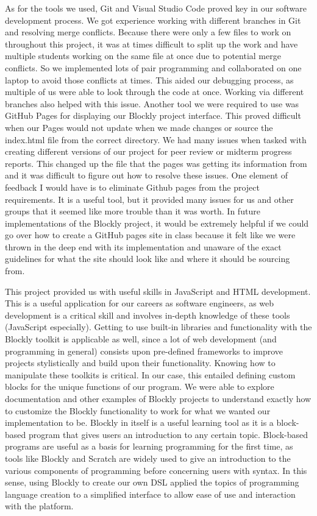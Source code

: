 \documentclass{article}
\theoremstyle{theorem}
\theoremstyle{definition}
\theoremstyle{remark}
\begin{document}
As for the tools we used, Git and Visual Studio Code proved key in our software development process. We got experience working with different branches in Git and resolving merge conflicts. Because there were only a few files to work on throughout this project, it was at times difficult to split up the work and have multiple students working on the same file at once due to potential merge conflicts. So we implemented lots of pair programming and collaborated on one laptop to avoid those conflicts at times. This aided our debugging process, as multiple of us were able to look through the code at once. Working via different branches also helped with this issue. Another tool we were required to use was GitHub Pages for displaying our Blockly project interface. This proved difficult when our Pages would not update when we made changes or source the index.html file from the correct directory. We had many issues when tasked with creating different versions of our project for peer review or midterm progress reports. This changed up the file that the pages was getting its information from and it was difficult to figure out how to resolve these issues. One element of feedback I would have is to eliminate Github pages from the project requirements. It is a useful tool, but it provided many issues for us and other groups that it seemed like more trouble than it was worth. In future implementations of the Blockly project, it would be extremely helpful if we could go over how to create a GitHub pages site in class because it felt like we were thrown in the deep end with its implementation and unaware of the exact guidelines for what the site should look like and where it should be sourcing from. 

This project provided us with useful skills in JavaScript and HTML development. This is a useful application for our careers as software engineers, as web development is a critical skill and involves in-depth knowledge of these tools (JavaScript especially). Getting to use built-in libraries and functionality with the Blockly toolkit is applicable as well, since a lot of web development (and programming in general) consists upon pre-defined frameworks to improve projects stylistically and build upon their functionality. Knowing how to manipulate these toolkits is critical. In our case, this entailed defining custom blocks for the unique functions of our program. We were able to explore documentation and other examples of Blockly projects to understand exactly how to customize the Blockly functionality to work for what we wanted our implementation to be. Blockly in itself is a useful learning tool as it is a block-based program that gives users an introduction to any certain topic. Block-based programs are useful as a basis for learning programming for the first time, as tools like Blockly and Scratch are widely used to give an introduction to the various components of programming before concerning users with syntax. In this sense, using Blockly to create our own DSL applied the topics of programming language creation to a simplified interface to allow ease of use and interaction with the platform. 
\end{document}
